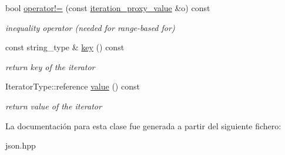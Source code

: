 \begin{DoxyCompactItemize}
\mbox{\label{classnlohmann_1_1detail_1_1iteration__proxy__value_a646dbb2b1842f44f42ee1e14245b8595}} 
bool \mbox{\hyperlink{classnlohmann_1_1detail_1_1iteration__proxy__value_a646dbb2b1842f44f42ee1e14245b8595}{operator!=}} (const \mbox{\hyperlink{classnlohmann_1_1detail_1_1iteration__proxy__value}{iteration\+\_\+proxy\+\_\+value}} \&o) const
\begin{DoxyCompactList}\small\item\em inequality operator (needed for range-\/based for) \end{DoxyCompactList}\item 
\mbox{\label{classnlohmann_1_1detail_1_1iteration__proxy__value_af2949ac0d70212738030bfda29c5bcc2}} 
const string\+\_\+type \& \mbox{\hyperlink{classnlohmann_1_1detail_1_1iteration__proxy__value_af2949ac0d70212738030bfda29c5bcc2}{key}} () const
\begin{DoxyCompactList}\small\item\em return key of the iterator \end{DoxyCompactList}\item 
\mbox{\label{classnlohmann_1_1detail_1_1iteration__proxy__value_ab8e33bd01c285a1a80b737a1905ceb97}} 
Iterator\+Type\+::reference \mbox{\hyperlink{classnlohmann_1_1detail_1_1iteration__proxy__value_ab8e33bd01c285a1a80b737a1905ceb97}{value}} () const
\begin{DoxyCompactList}\small\item\em return value of the iterator \end{DoxyCompactList}\end{DoxyCompactItemize}


La documentación para esta clase fue generada a partir del siguiente fichero\+:\begin{DoxyCompactItemize}
\item 
json.\+hpp\end{DoxyCompactItemize}
